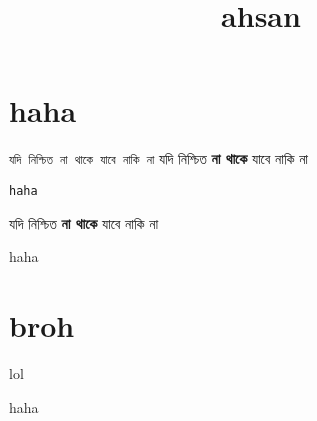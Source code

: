 \documentclass[a4paper, 11pt]{article}
\title{\vspace{-3em}\bfseries ahsan\vspace{-1em}}
\begin{document}
\maketitle

\section{haha}

\texttt{যদি নিশ্চিত না থাকে যাবে নাকি না}
যদি নিশ্চিত \textbf{না থাকে }যাবে নাকি না

\texttt{haha}

\begin{problem}
    [যদি নিশ্চিত না থাকে যাবে নাকি না]
    যদি নিশ্চিত \textbf{না থাকে }যাবে নাকি না
\end{problem}

\begin{theorem}[mehe]
    haha    
\end{theorem}


\section{broh}

\begin{problem}
    [haha]
    lol
\end{problem}

\begin{theorem}[mehe]
    haha    
\end{theorem}
\end{document}
